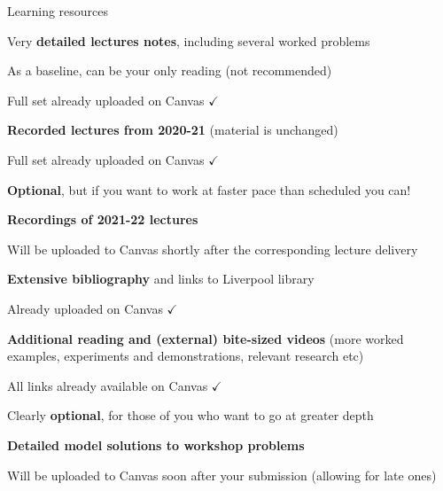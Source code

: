 %
%
%

\begin{frame}{Learning resources}

\begin{itemize}

{\small
\item Very {\bf detailed lectures notes}, including several worked problems
  \begin{itemize}
    {\scriptsize
      \item As a baseline, can be your only reading (not recommended)
      \item Full set already uploaded on Canvas {\color{green}$\checkmark$}
    }
  \end{itemize}

\item {\bf Recorded lectures from 2020-21} (material is unchanged)
\begin{itemize}
  {\scriptsize
    \item Full set already uploaded on Canvas {\color{green}$\checkmark$}
    \item {\bf Optional}, but if you want to work at faster pace than scheduled you can!
  }
\end{itemize}

\item {\bf Recordings of 2021-22 lectures}
\begin{itemize}
  {\scriptsize
    \item Will be uploaded to Canvas shortly after the corresponding lecture delivery
  }
\end{itemize}

\item {\bf Extensive bibliography} and links to Liverpool library
\begin{itemize}
  {\scriptsize
  \item Already uploaded on Canvas {\color{green}$\checkmark$}
  }
\end{itemize}

\item {\bf Additional reading and (external) bite-sized videos}
  (more worked examples, experiments and demonstrations, relevant research etc)
\begin{itemize}
  {\scriptsize
  \item All links already available on Canvas {\color{green}$\checkmark$}
  \item Clearly {\bf optional}, for those of you who want to go at greater depth
  }
\end{itemize}

\item {\bf Detailed model solutions to workshop problems}
\begin{itemize}
  {\scriptsize
    \item Will be uploaded to Canvas soon after your submission (allowing for late ones)
  }
\end{itemize}

}
\end{itemize}

\end{frame}

